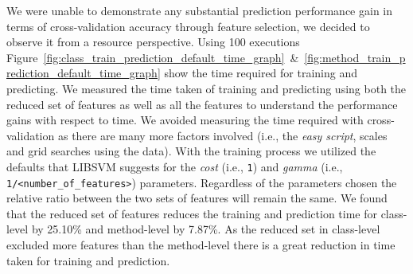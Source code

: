 We were unable to demonstrate any substantial prediction performance gain in terms of cross-validation accuracy through feature selection, we decided to observe it from a resource perspective. Using 100 executions Figure~\ref{fig:class_train_prediction_default_time_graph}~\&~\ref{fig:method_train_prediction_default_time_graph} show the time required for training and predicting. We measured the time taken of training and predicting using both the reduced set of features as well as all the features to understand the performance gains with respect to time. We avoided measuring the time required with cross-validation as there are many more factors involved (i.e., the \emph{easy script}, scales and grid searches using the data). With the training process we utilized the defaults that LIBSVM suggests for the \emph{cost} (i.e., \texttt{1}) and \emph{gamma} (i.e., \texttt{1/<number\_of\_features>}) parameters. Regardless of the parameters chosen the relative ratio between the two sets of features will remain the same. We found that the reduced set of features reduces the training and prediction time for class-level by 25.10\% and method-level by 7.87\%. As the reduced set in class-level excluded more features than the method-level there is a great reduction in time taken for training and prediction.
